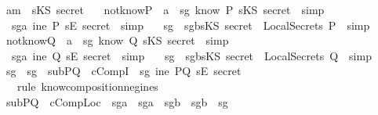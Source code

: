 \begin{isabellebody}
\ \ \isamarkupfalse \ a{}{\isacharcolon}{\isachardoublequoteopen}m\ {\isacharequal}\ sKS\ secret{\isachardoublequoteclose}\isanewline
\ \ \isamarkupfalse \ notknowP\ \ a{}\ \isamarkupfalse \ sg{}{\isacharcolon}{\isachardoublequoteopen}{\isasymnot}\ know\ P\ {\isacharparenleft}sKS\ secret{\isacharparenright}{\isachardoublequoteclose}\ \isamarkupfalse \ simp\isanewline
\ \ \isamarkupfalse \ \isamarkupfalse \ sg{}a{\isacharcolon}{\isachardoublequoteopen}{\isasymnot}\ ine\ P\ {\isacharparenleft}sE\ secret{\isacharparenright}{\isachardoublequoteclose}\ \isamarkupfalse \ simp\isanewline
\ \ \isamarkupfalse \ sg{}\ \isamarkupfalse \ sg{}b{\isacharcolon}{\isachardoublequoteopen}sKS\ secret\ {\isasymnotin}\ LocalSecrets\ P{\isachardoublequoteclose}\ \isamarkupfalse \ simp\isanewline
\ \ \isamarkupfalse \ notknowQ\ \ a{}\ \isamarkupfalse \ sg{}{\isacharcolon}{\isachardoublequoteopen}{\isasymnot}\ know\ Q\ {\isacharparenleft}sKS\ secret{\isacharparenright}{\isachardoublequoteclose}\ \isamarkupfalse \ simp\isanewline
\ \ \isamarkupfalse \ \isamarkupfalse \ sg{}a{\isacharcolon}{\isachardoublequoteopen}{\isasymnot}\ ine\ Q\ {\isacharparenleft}sE\ secret{\isacharparenright}{\isachardoublequoteclose}\ \isamarkupfalse \ simp\isanewline
\ \ \isamarkupfalse \ sg{}\ \isamarkupfalse \ sg{}b{\isacharcolon}{\isachardoublequoteopen}sKS\ secret\ {\isasymnotin}\ LocalSecrets\ Q{\isachardoublequoteclose}\ \isamarkupfalse \ simp\isanewline
\ \ \isamarkupfalse \ sg{}\ \ sg{}\ \ subPQ\ \ cCompI\ \isamarkupfalse \ sg{}{\isacharcolon}{\isachardoublequoteopen}{\isasymnot}\ ine\ PQ\ {\isacharparenleft}sE\ secret{\isacharparenright}{\isachardoublequoteclose}\isanewline
\ \ \ \ \isamarkupfalse \ {\isacharparenleft}rule\ know{\isacharunderscore}composition{\isacharunderscore}neg{\isacharunderscore}ine{\isacharunderscore}s{\isacharparenright}\ \isanewline
\ \ \isamarkupfalse \ subPQ\ \ cCompLoc\ \ sg{}a\ \ sg{}a\ \ sg{}b\ \ sg{}b\ \isamarkupfalse \ sg{}{\isacharcolon}\isanewline

\end{isabellebody}
